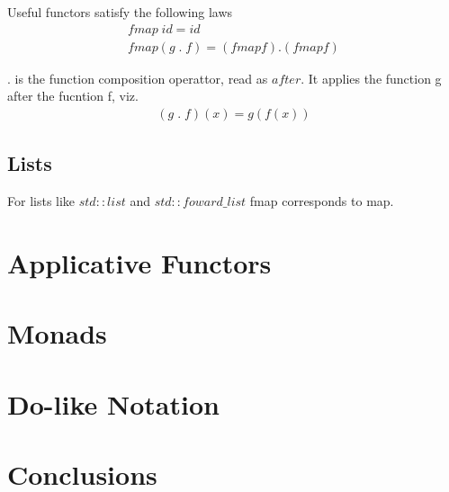\documentclass[12pt,fleqn]{article}
\begin{document}
Useful functors satisfy the following laws
\begin{eqnarray*}
fmap \; id = id  \\
fmap (g \; . \; f) = (fmap f) . (fmap f) 
\end{eqnarray*}

$.$ is the function composition operattor, read as $after$. It applies the function g after the fucntion f, viz.
\begin{eqnarray*}
(g \; . \; f)(x) = g(f(x)) 
\end{eqnarray*}


\subsection{Lists}
For lists like $std::list$ and $std::foward\_list$ fmap corresponds to map.


\section*{Applicative Functors}

\section*{Monads}
 
\section*{Do-like Notation}
 


\section*{Conclusions}
\end{document}
